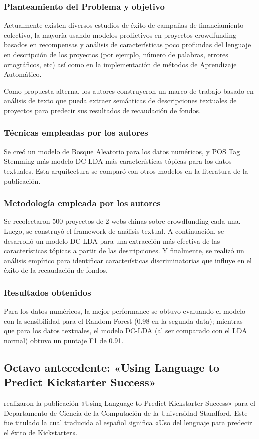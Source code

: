 \subsubsection{Planteamiento del Problema y objetivo}
Actualmente existen diversos estudios de éxito de campañas de financiamiento colectivo, la mayoría usando modelos predictivos en proyectos crowdfunding basados en recompensas y análisis de características poco profundas del lenguaje en descripción de los proyectos (por ejemplo, número de palabras, errores ortográficos, etc) así como en la implementación de métodos de Aprendizaje Automático.

Como propuesta alterna, los autores construyeron un marco de trabajo basado en análisis de texto que pueda extraer semánticas de descripciones textuales de proyectos para predecir sus resultados de recaudación de fondos.

\subsubsection{Técnicas empleadas por los autores}
Se creó un modelo de Bosque Aleatorio para los datos numéricos, y POS Tag Stemming más modelo DC-LDA más características tópicas para los datos textuales. Esta arquitectura se comparó con otros modelos en la literatura de la publicación.

\subsubsection{Metodología empleada por los autores}
Se recolectaron 500 proyectos de 2 webs chinas sobre crowdfunding cada una. Luego, se construyó el framework de análisis textual. A continuación, se desarrolló un modelo DC-LDA para una extracción más efectiva de las características tópicas a partir de las descripciones. Y finalmente, se realizó un análisis empírico para identificar características discriminatorias que influye en el éxito de la recaudación de fondos.

\subsubsection{Resultados obtenidos}
Para los datos numéricos, la mejor performance se obtuvo evaluando el modelo con la sensibilidad para el Random Forest (0.98 en la segunda data); mientras que para los datos textuales, el modelo DC-LDA (al ser comparado con el LDA normal) obtuvo un puntaje F1 de 0.91.

\subsection{Octavo antecedente: «Using Language to Predict Kickstarter Success» \citep*{pr_sawhney2016usingLT}}
\citeauthor{pr_sawhney2016usingLT} realizaron la publicación «Using Language to Predict Kickstarter Success» para el Departamento de Ciencia de la Computación de la Universidad Standford. Este fue titulado  la cual traducida al español significa «Uso del lenguaje para predecir el éxito de Kickstarter».

